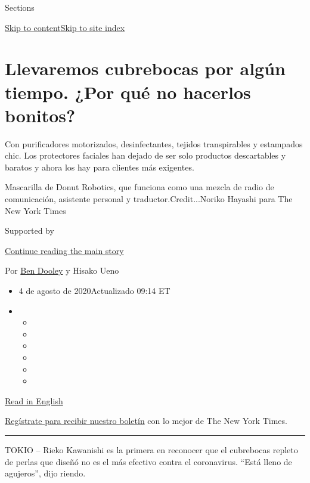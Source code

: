 Sections

\protect\hyperlink{site-content}{Skip to
content}\protect\hyperlink{site-index}{Skip to site index}

\hypertarget{llevaremos-cubrebocas-por-alguxfan-tiempo-por-quuxe9-no-hacerlos-bonitos}{%
\section{Llevaremos cubrebocas por algún tiempo. ¿Por qué no hacerlos
bonitos?}\label{llevaremos-cubrebocas-por-alguxfan-tiempo-por-quuxe9-no-hacerlos-bonitos}}

Con purificadores motorizados, desinfectantes, tejidos transpirables y
estampados chic. Los protectores faciales han dejado de ser solo
productos descartables y baratos y ahora los hay para clientes más
exigentes.

Mascarilla de Donut Robotics, que funciona como una mezcla de radio de
comunicación, asistente personal y traductor.Credit...Noriko Hayashi
para The New York Times

Supported by

\protect\hyperlink{after-sponsor}{Continue reading the main story}

Por \href{https://www.nytimes3xbfgragh.onion/by/ben-dooley}{Ben Dooley}
y Hisako Ueno

\begin{itemize}
\item
  4 de agosto de 2020Actualizado 09:14 ET
\item
  \begin{itemize}
  \item
  \item
  \item
  \item
  \item
  \item
  \end{itemize}
\end{itemize}

\href{https://www.nytimes3xbfgragh.onion/2020/07/27/business/fashion-masks-coronavirus.html}{Read
in English}

\href{https://www.nytimes3xbfgragh.onion/newsletters/el-times}{Regístrate
para recibir nuestro boletín} con lo mejor de The New York Times.

\begin{center}\rule{0.5\linewidth}{\linethickness}\end{center}

TOKIO -- Rieko Kawanishi es la primera en reconocer que el cubrebocas
repleto de perlas que diseñó no es el más efectivo contra el
coronavirus. ``Está lleno de agujeros'', dijo riendo.

